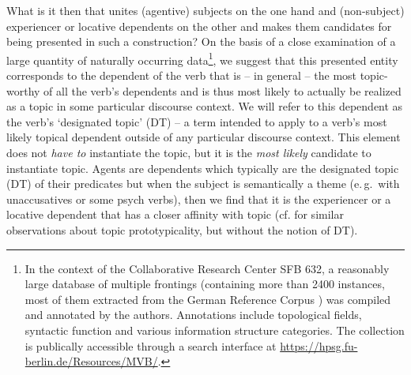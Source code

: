 \begin{exe}
\begin{xlist}[iv.]
\begin{exe}
\begin{xlist}[iv.]
What is it then that unites (agentive) subjects on the one hand and (non-subject) experiencer or
locative dependents on the other and makes them candidates for being presented in such a
construction? On the basis of a close examination of a large quantity of naturally occurring
data\footnote{In the context of the Collaborative Research Center SFB 632, a reasonably large
  database of multiple frontings (containing more than 2400 instances, most of them extracted from
  the German Reference Corpus \citep{DeReKo}) was compiled and annotated by the authors. Annotations
  include topological fields, syntactic function and various information structure categories. The
  collection is publically accessible through a search interface at
  \url{https://hpsg.fu-berlin.de/Resources/MVB/}.},
we suggest that this presented entity
corresponds to the dependent of the verb that is -- in general -- the most topic-worthy of all the
verb's dependents and is thus most likely to actually be realized as a topic in some particular
discourse context. We will refer to this dependent as the verb’s `designated topic' (DT) -- a term
intended to apply to a verb’s most likely topical dependent outside of any particular discourse
context. This element does not \textit{have to} instantiate the topic, but it is the \textit{most
  likely} candidate to instantiate topic. Agents are dependents which typically are the designated
topic (DT) of their predicates but when the subject is semantically a theme (e.\,g.\ with
unaccusatives or some psych verbs), then we find that it is the experiencer or a locative dependent
that has a closer affinity with topic (cf. \cite{vanOosten84a-u} for similar observations about
topic prototypicality, but without the notion of DT).


\end{xlist}
\end{exe}
\end{xlist}
\end{exe}
